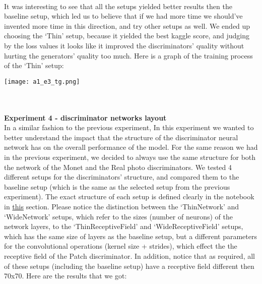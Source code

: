 \documentclass{article}
\begin{document}
\begin{table}[!ht]
    \centering
\end{table}
\\
It was interesting to see that all the setups yielded better results then the baseline setup, which led us to believe that if we had more time we should’ve invented more time in this direction, and try other setups as well. We ended up choosing the ‘Thin’ setup, because it yielded the best kaggle score, and judging by the loss values it looks like it improved the discriminators’ quality without hurting the generators’ quality too much. Here is a graph of the training process of the ‘Thin’ setup:

\begin{center}
    \texttt{[image: a1\_e3\_tg.png]}
\end{center}
\\\\
\newblock
\textbf{Experiment 4 - discriminator networks layout}
\\
In a similar fashion to the previous experiment, In this experiment we wanted to better understand the impact that the structure of the discriminator neural network has on the overall performance of the model. For the same reason we had in the previous experiment, we decided to always use the same structure for both the network of the Monet and the Real photo discriminators. We tested 4 different setups for the discriminators’ structure, and compared them to the baseline setup (which is the same as the selected setup from the previous experiment). The exact structure of each setup is defined clearly in the notebook in \href{https://colab.research.google.com/drive/1O95T3f5k68-do9Ml-EqE1FKqu67zdDw1#scrollTo=Build_patch_discriminator_model}{this} section. Please notice the distinction between the ‘ThinNetwork’ and ‘WideNetwork’ setups, which refer to the sizes (number of neurons) of the network layers, to the ‘ThinReceptiveField’ and ‘WideReceptiveField’ setups, which has the same size of layers as the baseline setup, but a different parameters for the convolutional operations (kernel size + strides), which effect the the receptive field of the Patch discriminator. In addition, notice that as required, all of these setups (including the baseline setup) have a receptive field different then 70x70. Here are the results that we got:
\end{document}
